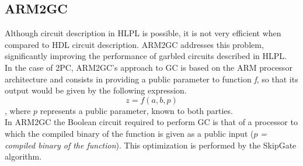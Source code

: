 \begin{refsection}
\subsection{ARM2GC}
Although circuit description in HLPL is possible, it is not very efficient when compared to HDL circuit description. ARM2GC addresses this problem, significantly improving the performance of garbled circuits described in HLPL.\\
In the case of 2PC, ARM2GC's approach to GC is based on the ARM processor architecture and consists in providing a public parameter to function \textit{f}, so that its output would be given by the following expression.
\begin{equation}\label{eq:arm2gc}
z = f(a,b,p)
\end{equation}
, where $p$ represents a public parameter, known to both parties.\\
In ARM2GC the Boolean circuit required to perform GC is that of a processor to which the compiled binary of the function is given as a public input ($p$\textit{ = compiled binary of the function}). This optimization is performed by the SkipGate algorithm.



\clearpage
\printbibliography[heading=subbibliography]
\end{refsection}
\cleardoublepage
